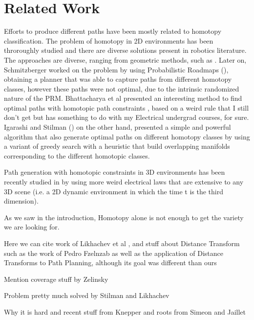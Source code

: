 \documentclass[graybox]{svmult}
\begin{document}
\section{Related Work}
\label{sec:RelatedWork}
Efforts to produce different paths have been mostly related to homotopy classification. The problem of homotopy in 2D environments has been throroughly studied and there are diverse solutions present in robotics literature. The approaches are diverse, ranging from geometric methods, such as \cite{}. Later on, Schmitzberger worked on the problem by using Probabilistic Roadmaps (\cite{Schmitzberger2002Homo2D}), obtaining a planner that was able to capture paths from different homotopy classes, however these paths were not optimal, due to the intrinsic randomized nature of the PRM.
Bhattacharya et al presented an interesting method to find optimal paths with homotopic path constraints \cite{Bhattacharya2010Homotopy2D}, based on a weird rule that I still don't get but has something to do with my Electrical undergrad courses, for sure. Igarashi and Stilman (\cite{Igarashi2010Homotopy2D}) on the other hand, presented a simple and powerful algorithm that also generate optimal paths on different homotopy classes by using a variant of greedy search with a heuristic that build overlapping manifolds corresponding to the different homotopic classes.

Path generation with homotopic constraints in 3D environments has been recently studied in \cite{Bhattacharya2011Homotopy3D} by using more weird electrical laws that are extensive to any 3D scene (i.e. a 2D dynamic environment in which the time t is the third dimension).

As we saw in the introduction, Homotopy alone is not enough to get the variety we are looking for.
 
 
Here we can cite work of Likhachev et al \cite{Bhattacharya2011Homotopy3D}, and stuff about Distance Transform such as the work of Pedro Fzelnzab as well as the application of Distance Transforms to Path Planning, although its goal was different than ours

Mention coverage stuff by Zelinsky \cite{Zelinsky1993Coverage}

Problem pretty much solved by Stilman \cite{Igarashi2010Homotopy2D} and Likhachev \cite{Bhattacharya2010Homotopy2D}

Why it is hard and recent stuff from Knepper \cite{Knepper2012Equivalence} and roots from Simeon \cite{Simeon2000VisibilityPRM} and Jaillet \cite{Jaillet2008PathDeformation}
\end{document}
